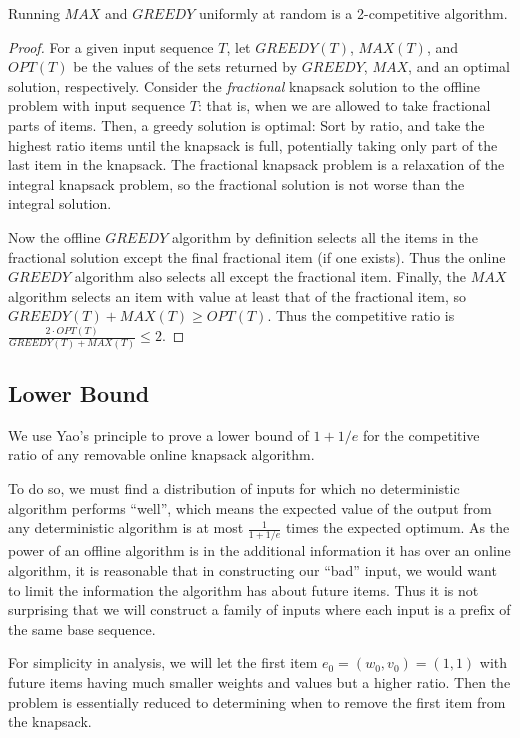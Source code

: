\begin{theorem}
	\emph{\cite{han}}
	Running $MAX$ and $GREEDY$ uniformly at random is a 2-competitive algorithm.
\end{theorem}
\begin{proof}
	For a given input sequence $T$, let $GREEDY(T)$, $MAX(T)$, and $OPT(T)$ be the values of the sets returned by $GREEDY$, $MAX$, and an optimal solution, respectively. Consider the \emph{fractional} knapsack solution to the offline problem with input sequence $T$: that is, when we are allowed to take fractional parts of items. Then, a greedy solution is optimal: Sort by ratio, and take the highest ratio items until the knapsack is full, potentially taking only part of the last item in the knapsack. The fractional knapsack problem is a relaxation of the integral knapsack problem, so the fractional solution is not worse than the integral solution.
	
	Now the offline $GREEDY$ algorithm by definition selects all the items in the fractional solution except the final fractional item (if one exists). Thus the online $GREEDY$ algorithm also selects all except the fractional item. Finally, the $MAX$ algorithm selects an item with value at least that of the fractional item, so $GREEDY(T)+MAX(T) \ge OPT(T)$. Thus the competitive ratio is $\frac{2\cdot OPT(T)}{GREEDY(T)+MAX(T)} \le 2$.
\end{proof}

\subsection{Lower Bound}
We use Yao's principle to prove a lower bound of $1+1/e$ for the competitive ratio of any removable online knapsack algorithm.

To do so, we must find a distribution of inputs for which no deterministic algorithm performs ``well'', which means the expected value of the output from any deterministic algorithm is at most $\frac{1}{1+1/e}$ times the expected optimum. As the power of an offline algorithm is in the additional information it has over an online algorithm, it is reasonable that in constructing our ``bad'' input, we would want to limit the information the algorithm has about future items. Thus it is not surprising that we will construct a family of inputs where each input is a prefix of the same base sequence.

For simplicity in analysis, we will let the first item $e_0=(w_0,v_0)=(1,1)$ with future items having much smaller weights and values but a higher ratio. Then the problem is essentially reduced to determining when to remove the first item from the knapsack.

